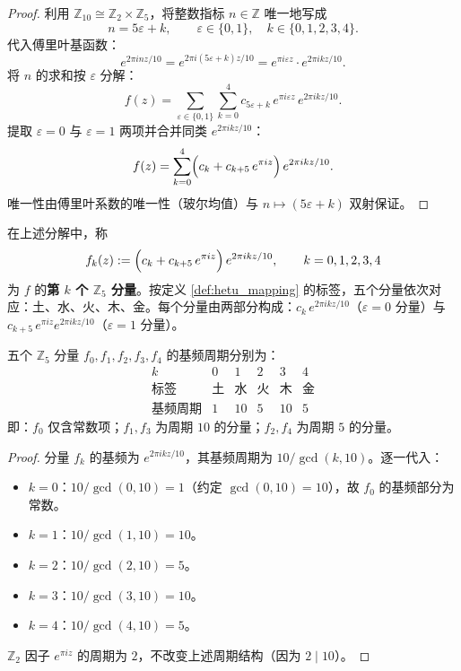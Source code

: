 \begin{proof}
利用 $\mathbb{Z}_{10} \cong \mathbb{Z}_2 \times \mathbb{Z}_5$，将整数指标 $n \in \mathbb{Z}$ 唯一地写成
\[
n = 5\varepsilon + k, \qquad \varepsilon \in \{0, 1\}, \quad k \in \{0, 1, 2, 3, 4\}.
\]
代入傅里叶基函数：
\[
e^{2\pi i n z / 10} = e^{2\pi i (5\varepsilon + k) z / 10} = e^{\pi i \varepsilon z} \cdot e^{2\pi i k z / 10}.
\]
将 $n$ 的求和按 $\varepsilon$ 分解：
\[
f(z) = \sum_{\varepsilon \in \{0,1\}} \sum_{k=0}^{4} c_{5\varepsilon+k}\, e^{\pi i \varepsilon z}\, e^{2\pi i k z / 10}.
\]
提取 $\varepsilon = 0$ 与 $\varepsilon = 1$ 两项并合并同类 $e^{2\pi i k z / 10}$：
\[
f(z) = \sum_{k=0}^{4} \Bigl( c_k + c_{k+5}\, e^{\pi i z} \Bigr)\, e^{2\pi i k z / 10}.
\]
唯一性由傅里叶系数的唯一性（玻尔均值）与 $n \mapsto (5\varepsilon + k)$ 双射保证。
\end{proof}

\begin{definition}[$\mathbb{Z}_5$ 分量]\label{def:hetu_five_components}
在上述分解中，称
\[
f_k(z) := \Bigl( c_k + c_{k+5}\, e^{\pi i z} \Bigr)\, e^{2\pi i k z / 10}, \qquad k = 0, 1, 2, 3, 4
\]
为 $f$ 的\textbf{第 $k$ 个 $\mathbb{Z}_5$ 分量}。按定义 \ref{def:hetu_mapping} 的标签，五个分量依次对应：土、水、火、木、金。每个分量由两部分构成：$c_k\, e^{2\pi i k z / 10}$（$\varepsilon = 0$ 分量）与 $c_{k+5}\, e^{\pi i z} e^{2\pi i k z / 10}$（$\varepsilon = 1$ 分量）。
\end{definition}

\begin{proposition}\label{prop:hetu_five_periods}
五个 $\mathbb{Z}_5$ 分量 $f_0, f_1, f_2, f_3, f_4$ 的基频周期分别为：
\[
\begin{array}{c|ccccc}
k & 0 & 1 & 2 & 3 & 4 \\
\hline
\text{标签} & \text{土} & \text{水} & \text{火} & \text{木} & \text{金} \\
\text{基频周期} & 1 & 10 & 5 & 10 & 5
\end{array}
\]
即：$f_0$ 仅含常数项；$f_1, f_3$ 为周期 $10$ 的分量；$f_2, f_4$ 为周期 $5$ 的分量。
\end{proposition}

\begin{proof}
分量 $f_k$ 的基频为 $e^{2\pi i k z / 10}$，其基频周期为 $10/\gcd(k, 10)$。逐一代入：
\begin{itemize}
    \item $k = 0$：$10/\gcd(0,10) = 1$（约定 $\gcd(0,10) = 10$），故 $f_0$ 的基频部分为常数。
    \item $k = 1$：$10/\gcd(1,10) = 10$。
    \item $k = 2$：$10/\gcd(2,10) = 5$。
    \item $k = 3$：$10/\gcd(3,10) = 10$。
    \item $k = 4$：$10/\gcd(4,10) = 5$。
\end{itemize}
$\mathbb{Z}_2$ 因子 $e^{\pi i z}$ 的周期为 $2$，不改变上述周期结构（因为 $2 \mid 10$）。
\end{proof}

